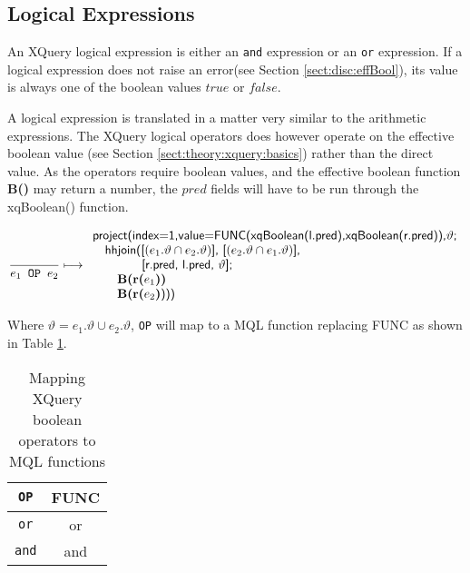 \subsection{Logical Expressions}
\label{sect:trans:TD:logical}
An XQuery logical expression is either an \texttt{and} expression or an \texttt{or} expression. If a logical
expression does not raise an error(see Section \ref{sect:disc:effBool}), its value is always one of the boolean
values $true$ or $false$.

A logical expression is translated in a matter very similar to the arithmetic expressions. The XQuery logical
operators does however operate on the effective boolean value (see Section \ref{sect:theory:xquery:basics}) rather
than the direct value. As the operators require boolean values, and the effective boolean function \textbf{B()}
may return a number, the $pred$ fields will have to be run through the \textsf{xqBoolean()} function.

\begin{equation}
\frac{}{e_1 \mbox{\texttt{ OP }} e_2}\longmapsto
\begin{array}{l}
\mbox{\textsf{project(index=1,value=FUNC(xqBoolean(l.pred),xqBoolean(r.pred)),}}\vartheta\mbox{\textsf{;}} \\ \quad
\mbox{\textsf{hhjoin([}}(e_1.\vartheta\cap e_2.\vartheta)\mbox{\textsf{], [}}(e_2.\vartheta\cap e_1.\vartheta)
\mbox{\textsf{],}} 
\\ \quad \quad \quad \quad\mbox{\textsf{[r.pred, l.pred, }}\vartheta\mbox{\textsf{];}} \\ \quad \quad
\mbox{\textbf{B(r(}}e_1\mbox{\textbf{))}} \\ \quad \quad
\mbox{\textbf{B(r(}}e_2\mbox{\textbf{)}\textsf{)))}}
\end{array}
\label{rule:trans:TD:andOr}
\end{equation}

Where $\vartheta = e_1.\vartheta \cup e_2.\vartheta$, \texttt{OP} will map to a MQL function replacing
\textsf{FUNC} as shown in Table \ref{tab:trans:TD:logMap}. 

\begin{table}[h]
\centering
\begin{tabular}{c|c}
\texttt{OP} & \textsf{FUNC} \\ \hline
\texttt{or} & \textsf{or} \\
\texttt{and} & \textsf{and} \\
\end{tabular}
\caption{Mapping XQuery boolean operators to MQL functions \label{tab:trans:TD:logMap}}
\end{table}

